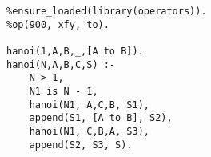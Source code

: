 \begin{verbatim}
%ensure_loaded(library(operators)).
%op(900, xfy, to).

hanoi(1,A,B,_,[A to B]). 
hanoi(N,A,B,C,S) :- 
	N > 1,
	N1 is N - 1,
	hanoi(N1, A,C,B, S1),
	append(S1, [A to B], S2),
	hanoi(N1, C,B,A, S3),
	append(S2, S3, S).
\end{verbatim}
